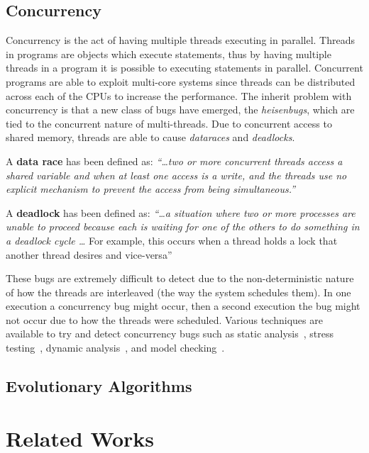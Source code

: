 \documentclass[10pt, conference, compsocconf]{IEEEtran}
\begin{document}
\subsection{Concurrency}
\label{sec:concurrency}
Concurrency is the act of having multiple threads executing in parallel.
Threads in programs are objects which execute statements, thus by having
multiple threads in a program it is possible to executing statements in
parallel. Concurrent programs are able to exploit multi-core systems since
threads can be distributed across each of the CPUs to increase the performance.
The inherit problem with concurrency is that a new class of bugs have emerged,
the \textit{heisenbugs}, which are tied to the concurrent nature of
multi-threads. Due to concurrent access to shared memory, threads are able to
cause \textit{dataraces} and \textit{deadlocks}.

A \textbf{data race} has been defined as: \textit{``\ldots two or more
concurrent threads access a shared variable and when at least one access is a
write, and the threads use no explicit mechanism to prevent the access from
being simultaneous.''}~\cite{LSW07}

A \textbf{deadlock} has been defined as: \textit{``\ldots a situation where two
or more processes are unable to proceed because each is waiting for one of the
others to do something in a deadlock cycle \ldots} For example, this occurs
when a thread holds a lock that another thread desires and
vice-versa''~\cite{LSW07}

These bugs are extremely difficult to detect due to the non-deterministic
nature of how the threads are interleaved (the way the system schedules them).
In one execution a concurrency bug might occur, then a second execution the bug
might not occur due to how the threads were scheduled. Various techniques are
available to try and detect concurrency bugs such as static
analysis~\cite{NA07,NPSG09,HP04}, stress testing~\cite{HSU03}, dynamic
analysis~\cite{JNPS09,EFN+02}, and model
checking~\cite{BHPV00,RDH03,OM03,MQB07,Holz97,JM04,BHPV00,HP00}.

\subsection{Evolutionary Algorithms}

\section{Related Works}
\end{document}
